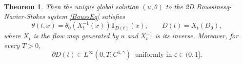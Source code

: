 \documentclass[reqno,11pt,a4paper]{amsart}
\newtheorem{theorem}{Theorem}[section]
\begin{document}
\begin{theorem}
Then the unique global solution $(u,\theta)$
to the 2D Boussinesq-Navier-Stokes system \eqref{BoussEq} satisfies
\begin{equation}\label{eq:the-patch-exp}
  \theta(t, x) = \bar{\theta}_0(X_t^{-1}(x)) \mathbf{1}_{D(t)}(x),\qquad D(t)=X_t(D_0),
\end{equation}
where $X_t$ is the flow map generated by $u$
and $X^{-1}_t$ is its inverse. Moreover, for every $T>0$,
\begin{equation}\label{eq:reg-parD(t)-1-0-main}
  \partial D(t) \in L^{\infty}\left(0, T ; C^{1,\gamma}\right)\;\; \textrm{uniformly in $\varepsilon \in (0,1]$}.
\end{equation}
\end{theorem}
\end{document}
